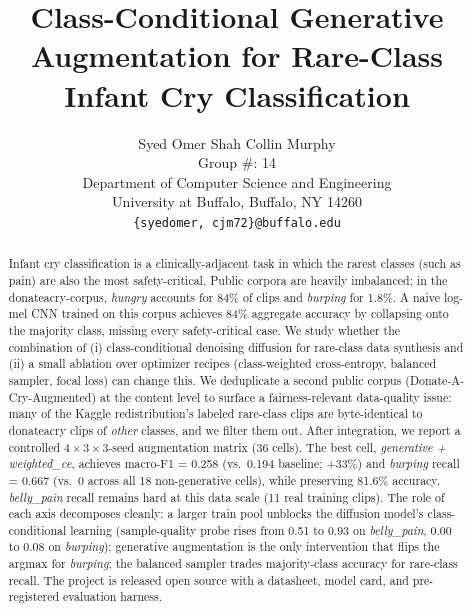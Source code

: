\documentclass[final]{article}
\title{Class-Conditional Generative Augmentation for Rare-Class Infant Cry Classification}
\author{
  Syed Omer Shah \quad Collin Murphy \\
  Group \#: 14 \\
  Department of Computer Science and Engineering \\
  University at Buffalo, Buffalo, NY 14260 \\
  \texttt{\{syedomer, cjm72\}@buffalo.edu}
}
\begin{document}
\maketitle

\begin{abstract}
Infant cry classification is a clinically-adjacent task in which the rarest classes (such as pain) are also the most safety-critical. Public corpora are heavily imbalanced; in the donateacry-corpus, \textit{hungry} accounts for 84\% of clips and \textit{burping} for 1.8\%. A naive log-mel CNN trained on this corpus achieves 84\% aggregate accuracy by collapsing onto the majority class, missing every safety-critical case. We study whether the combination of (i) class-conditional denoising diffusion for rare-class data synthesis and (ii) a small ablation over optimizer recipes (class-weighted cross-entropy, balanced sampler, focal loss) can change this. We deduplicate a second public corpus (Donate-A-Cry-Augmented) at the content level to surface a fairness-relevant data-quality issue: many of the Kaggle redistribution's labeled rare-class clips are byte-identical to donateacry clips of \emph{other} classes, and we filter them out. After integration, we report a controlled $4 \times 3 \times 3$-seed augmentation matrix (36 cells). The best cell, \textit{generative + weighted\_ce}, achieves macro-F1 = 0.258 (vs.\ 0.194 baseline; +33\%) and \emph{burping} recall = 0.667 (vs.\ 0 across all 18 non-generative cells), while preserving 81.6\% accuracy. \textit{belly\_pain} recall remains hard at this data scale (11 real training clips). The role of each axis decomposes cleanly: a larger train pool unblocks the diffusion model's class-conditional learning (sample-quality probe rises from 0.51 to 0.93 on \textit{belly\_pain}, 0.00 to 0.08 on \textit{burping}); generative augmentation is the only intervention that flips the argmax for \textit{burping}; the balanced sampler trades majority-class accuracy for rare-class recall. The project is released open source with a datasheet, model card, and pre-registered evaluation harness.
\end{abstract}
\end{document}
